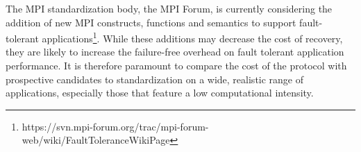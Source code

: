 The MPI standardization body, the MPI Forum, is currently considering
the addition of new MPI constructs, functions and semantics to support
fault-tolerant applications\footnote{https://svn.mpi-forum.org/trac/mpi-forum-web/wiki/FaultToleranceWikiPage}. While these additions may decrease the cost
of recovery, they are likely to increase the failure-free overhead on
fault tolerant application performance. It is therefore paramount to
compare the cost of the \cof protocol with prospective candidates to
standardization on a wide, realistic range of applications, especially
those that feature a low computational intensity.

